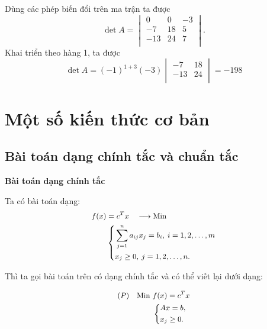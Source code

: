 \documentclass[12pt,a4paper]{report}
\begin{document}
Dùng các phép biến đổi trên ma trận ta được
\begin{equation*}
    \det A =
    \begin{vmatrix}
        0 & 0 & -3 \\
        -7 & 18 & 5 \\
        -13 & 24 & 7 \\
    \end{vmatrix}.
\end{equation*}
Khai triển theo hàng 1, ta được
\begin{equation*}
    \det A = (-1)^{1+3}(-3)
    \begin{vmatrix}
        -7 & 18 \\
        -13 & 24 \\
    \end{vmatrix}
    = -198
\end{equation*}


\section{Một số kiến thức cơ bản}

\subsection{Bài toán dạng chính tắc và chuẩn tắc}

     \textbf{Bài toán dạng chính tắc}
    
    Ta có bài toán dạng:
    \begin{equation} \small \label{F}
        \begin{split}
        f(x) & = c^Tx \quad \longrightarrow \text{Min} \\
            & \left\{
            \begin{split}
            & \sum _{j=1}^n a_{ij} x_j = b_i, \: i=1,2,\ldots,m \\
            & x_j \geq 0, \: j=1,2,\ldots,n.
            \end{split}
            \right.    
        \end{split}
    \end{equation}

    Thì ta gọi bài toán trên có dạng chính tắc và có thể viết lại dưới dạng:

    \begin{equation} \small \label{3217}
        \begin{split}
        (P) \quad \text{Min } & f(x) = c^Tx \\
            & \left\{
            \begin{split}
            & Ax=b, \\
            & x_j \geq 0.
            \end{split}
            \right.    
        \end{split}
    \end{equation}
\end{document}
